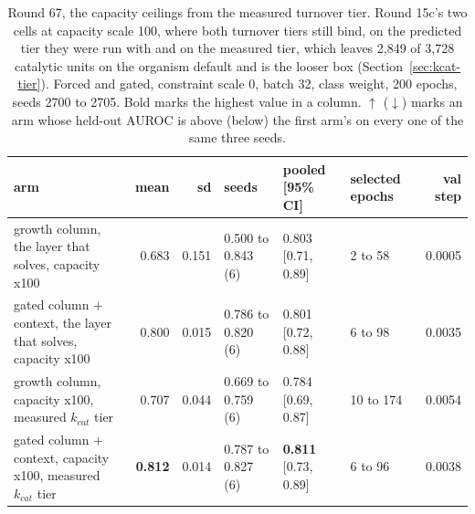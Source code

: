 \begin{table}[H]
  \centering
  \scriptsize
  \caption[Round 67, the capacity ceilings from the measured turnover tier]{Round 67, the capacity ceilings from the measured turnover tier. Round 15c's two cells at capacity scale 100, where both turnover tiers still bind, on the predicted tier they were run with and on the measured tier, which leaves 2,849 of 3,728 catalytic units on the organism default and is the looser box (Section~\ref{sec:kcat-tier}). Forced and gated, constraint scale 0, batch 32, class weight, 200 epochs, seeds 2700 to 2705. Bold marks the highest value in a column. $\uparrow$ ($\downarrow$) marks an arm whose held-out AUROC is above (below) the first arm's on every one of the same three seeds.}
  \label{tab:w83}
  \begin{tabular}{@{}lrrlllr@{}}
    \hline
    arm & mean & sd & seeds & pooled [95\% CI] & selected epochs & val step \\
    \hline
    growth column, the layer that solves, capacity x100 & 0.683 & 0.151 & 0.500 to 0.843 (6) & 0.803 [0.71, 0.89] & 2 to 58 & 0.0005 \\
    gated column $+$ context, the layer that solves, capacity x100 & 0.800 & 0.015 & 0.786 to 0.820 (6) & 0.801 [0.72, 0.88] & 6 to 98 & 0.0035 \\
    growth column, capacity x100, measured $k_{cat}$ tier & 0.707 & 0.044 & 0.669 to 0.759 (6) & 0.784 [0.69, 0.87] & 10 to 174 & 0.0054 \\
    gated column $+$ context, capacity x100, measured $k_{cat}$ tier & \textbf{0.812} & 0.014 & 0.787 to 0.827 (6) & \textbf{0.811} [0.73, 0.89] & 6 to 96 & 0.0038 \\
    \hline
  \end{tabular}
\end{table}
